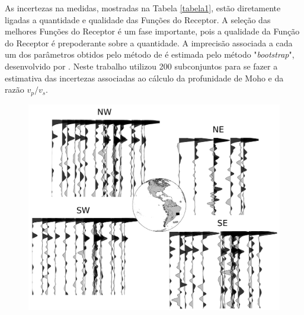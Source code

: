 As incertezas na medidas, mostradas na Tabela \ref{tabela1}, estão diretamente ligadas a quantidade e qualidade das Funções do Receptor. A seleção das melhores Funções do Receptor é um fase importante, pois a qualidade da Função do Receptor é prepoderante sobre a quantidade. A imprecisão associada a cada um dos parâmetros obtidos pelo método de \cite{Zhu_Kanamori_2000} é estimada pelo método "\textit{bootstrap}", desenvolvido por \cite{efron_statistical_1991}. Neste trabalho utilizou 200  subconjuntos para se fazer a estimativa das incertezas associadas ao  cálculo da profunidade de Moho e da razão $v_{p}/v_{s}$.

\begin{figure}[!ht]
\centering
\includegraphics[scale=0.5]{Figs/RF_azimute.png}
\caption{}
\label{RF_perfil_NW}
\end{figure}


